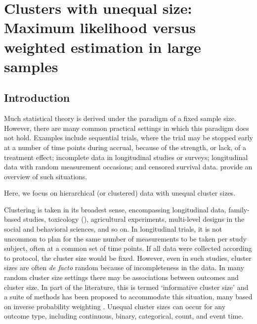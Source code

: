 \documentclass[11pt,a5paper,twoside]{book}
\begin{document}
\section[Compound-symmetry structure]{Clusters with unequal size: Maximum likelihood versus weighted estimation in large samples}
\label{sec_cs}
\subsection{Introduction}
\label{secintrocs}

Much statistical theory is derived under the paradigm of a fixed sample size. However, there are many common practical settings in which this paradigm does not hold. Examples include sequential trials, where the trial may be stopped early at a number of time points during accrual, because of the strength, or lack, of a treatment effect; incomplete data in longitudinal studies or surveys; longitudinal data with random measurement occasions; and censored survival data.
\cite{molenberghs2014random} provide an overview of such situations.

Here, we focus on hierarchical (or clustered) data with unequal cluster sizes.

Clustering is taken in its broadest sense, encompassing longitudinal data, family-based studies, toxicology (\cite{aerts2002}), agricultural experiments, multi-level designs in the social and behavioral sciences, and so on. In longitudinal trials, it is not uncommon to plan for the same number of measurements to be taken per study subject, often at a common set of time points. If all data were collected according to protocol, the cluster size would be fixed. However, even in such studies, cluster sizes are often {\em de facto\/} random because of incompleteness in the data. In many random cluster size settings there may be associations between outcomes and cluster size. In part of the literature, this is termed `informative cluster size' and a suite of methods has been proposed to accommodate this situation, many based on inverse probability weighting \citep{williamson2003marginal, benhin2005mean, hoffman2001, cong2007marginal, chiang2008efficient, wang2011inference, aerts2011incomplete}. Unequal cluster sizes can occur for any outcome type, including continuous, binary, categorical, count, and event time.


\end{document}
